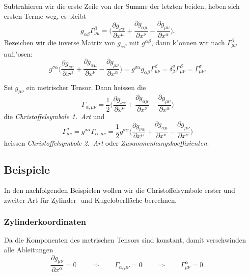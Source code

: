 Subtrahieren wir die erste Zeile von der Summe der letzten beiden,
heben sich ersten Terme weg, es bleibt
\[
g_{\alpha\beta}\Gamma_{\nu\mu}^\beta
=
\biggl(
\frac{\partial g_{\nu\alpha}}{\partial x^\mu}
+
\frac{\partial g_{\alpha\mu}}{\partial x^\nu}
-
\frac{\partial g_{\mu\nu}}{\partial x^\alpha}
\biggr).
\]
Bezeichen wir die inverse Matrix von $g_{\alpha\beta}$ mit
$g^{\alpha\beta}$, dann k"onnen wir nach $\Gamma_{\mu\nu}^\beta$ aufl"osen:
\[
g^{\sigma\alpha}
\biggl(
\frac{\partial g_{\nu\alpha}}{\partial x^\mu}
+
\frac{\partial g_{\alpha\mu}}{\partial x^\nu}
-
\frac{\partial g_{\mu\nu}}{\partial x^\alpha}
\biggr)
=
g^{\sigma\alpha}
g_{\alpha\beta}\Gamma_{\mu\nu}^\beta
=
\delta^\sigma_\beta\Gamma_{\mu\nu}^\beta
=
\Gamma_{\mu\nu}^\sigma.
\]

\begin{definition}
Sei $g_{\mu\nu}$ ein metrischer Tensor. 
Dann heissen die
\[
\Gamma_{\alpha,\mu\nu}
=
\frac12
\biggl(
\frac{\partial g_{\nu\alpha}}{\partial x^\mu}
+
\frac{\partial g_{\alpha\mu}}{\partial x^\nu}
-
\frac{\partial g_{\mu\nu}}{\partial x^\alpha}
\biggr)
\]
die {\em Christoffelsymbole 1.~Art}
und
\[
\Gamma_{\mu\nu}^\sigma
=
g^{\sigma\alpha} \Gamma_{\alpha,\mu\nu}
=
\frac12
g^{\sigma\alpha}
\biggl(
\frac{\partial g_{\nu\alpha}}{\partial x^\mu}
+
\frac{\partial g_{\alpha\mu}}{\partial x^\nu}
-
\frac{\partial g_{\mu\nu}}{\partial x^\alpha}
\biggr)
\]
heissen {\em Christoffelsymbole 2.~Art} oder {\em Zusammenhangskoeffizienten}.
\end{definition}

\subsection{Beispiele}
In den nachfolgenden Beispielen wollen wir die Christoffelsymbole erster
und zweiter Art für Zylinder- und Kugeloberfläche berechnen.

\subsubsection{Zylinderkoordinaten}
Da die Komponenten des metrischen Tensors sind konstant, damit verschwinden
alle Ableitungen
\[
\frac{\partial g_{\mu\nu}}{\partial x^\alpha}=0
\qquad\Rightarrow\qquad
\Gamma_{\alpha,\mu\nu}=0
\qquad\Rightarrow\qquad
\Gamma_{\mu\nu}^\alpha=0.
\]


